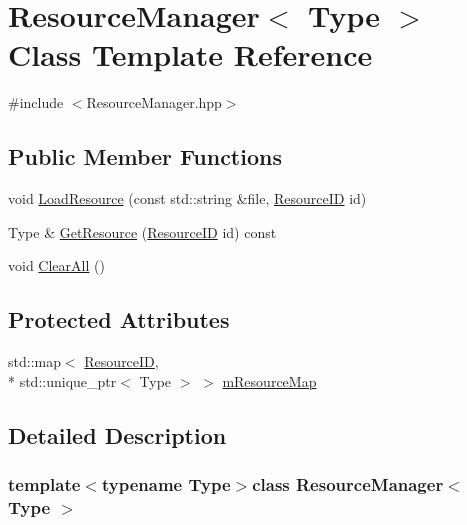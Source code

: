 \hypertarget{class_resource_manager}{\section{Resource\-Manager$<$ Type $>$ Class Template Reference}
\label{class_resource_manager}
}


{\ttfamily \#include $<$Resource\-Manager.\-hpp$>$}

\subsection*{Public Member Functions}
\begin{DoxyCompactItemize}
\item 
void \hyperlink{class_resource_manager_a38f6162e5f7d3b16273a23340b34e438}{Load\-Resource} (const std\-::string \&file, \hyperlink{_resource_manager_8hpp_adfdcfc7f1686e261462215a5a516110e}{Resource\-I\-D} id)
\item 
Type \& \hyperlink{class_resource_manager_af3e977ad6ea9972aebf6c7d7c15a19d6}{Get\-Resource} (\hyperlink{_resource_manager_8hpp_adfdcfc7f1686e261462215a5a516110e}{Resource\-I\-D} id) const 
\item 
void \hyperlink{class_resource_manager_a919997a4e1b07f62181bedad680915aa}{Clear\-All} ()
\end{DoxyCompactItemize}
\subsection*{Protected Attributes}
\begin{DoxyCompactItemize}
\item 
std\-::map$<$ \hyperlink{_resource_manager_8hpp_adfdcfc7f1686e261462215a5a516110e}{Resource\-I\-D}, \\*
std\-::unique\-\_\-ptr$<$ Type $>$ $>$ \hyperlink{class_resource_manager_af7f7accf221f620d9816ad3cfb80674e}{m\-Resource\-Map}
\end{DoxyCompactItemize}


\subsection{Detailed Description}
\subsubsection*{template$<$typename Type$>$class Resource\-Manager$<$ Type $>$}



